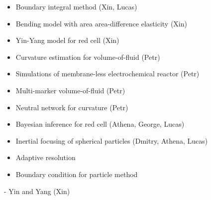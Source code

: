 \begin{itemize}
\item Boundary integral method (Xin, Lucas)
\item Bending model with area area-difference elasticity (Xin)
\item Yin-Yang model for red cell (Xin)
\item Curvature estimation for volume-of-fluid (Petr)
\item Simulations of membrane-less electrochemical reactor (Petr)
\item Multi-marker volume-of-fluid (Petr)
\item Neutral network for curvature (Petr)
\item Bayesian inference for red cell (Athena, George, Lucas)
\item Inertial focusing of spherical particles (Dmitry, Athena, Lucas)
\end{itemize}
\eframe

\begin{itemize}
\item Adaptive resolution
\item Boundary condition for particle method
\end{itemize}
\eframe

- Yin and Yang (Xin)
\eframe
